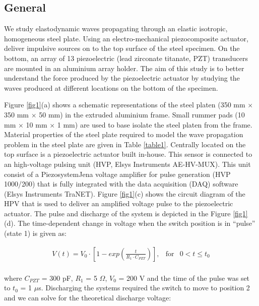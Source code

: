 \documentclass[preprint,3p, 11pt,authoryear]{elsarticle}
\begin{document}
\subsection{General}

We study elastodynamic waves propagating through an elastic isotropic, homogeneous steel plate. Using an electro-mechanical piezocomposite actuator, deliver impulsive sources on to the top surface of the steel specimen. On the bottom, an array of 13 piezoelectric (lead zirconate titanate, PZT) transducers are mounted in an aluminium array holder. The aim of this study is to better understand the force produced by the piezoelectric actuator by studying the waves produced at different locations on the bottom of the specimen.

Figure \ref{fig1}(a) shows a schematic representations of the steel platen (350 mm $\times$ 350 mm $\times$ 50 mm) in the extruded aluminium frame. Small rummer pads (10 mm $\times$ 10 mm $\times$ 1 mm) are used to base isolate the steel platen from the frame. Material properties of the steel plate required to model the wave propagation problem in the steel plate are given in Table \ref{table1}. Centrally located on the top surface is a piezoelectric actuator built in-house.  This sensor is connected to an high-voltage pulsing unit (HVP, Elsys Instruments AE-HV-MUX). This unit consist of a PiezosystemJena voltage amplifier for pulse generation (HVP 1000/200) that is fully integrated with the data acquisition (DAQ) software (Elsys Instruments TraNET). Figure \ref{fig1}(c) shows the circuit diagram of the HPV that is used to deliver an amplified voltage pulse to the piezoelectric actuator. The pulse and discharge of the system is depicted in the Figure \ref{fig1}(d). The time-dependent change in voltage when the switch position is in ``pulse'' (state 1) is given as:

\begin{equation}
\begin{array}{lcc}
  V(t) =  V_{0} \cdot \left[ 1 - exp\left(\frac{t}{R_{1}\cdot C_{PZT}} \right) \right], & \text{for} & 0 < t \leq t_{0}\\
\end{array}
\label{eq1}
\end{equation}

\noindent where $C_{PZT}$ = 300 pF, $R_{1}$ = 5 $\Omega$, $V_{0}$ = 200 V and the time of the pulse was set to $t_{0}$ = 1 $\mu$s. Discharging the systems required the switch to move to position 2 and we can solve for the theoretical discharge voltage:
\end{document}
